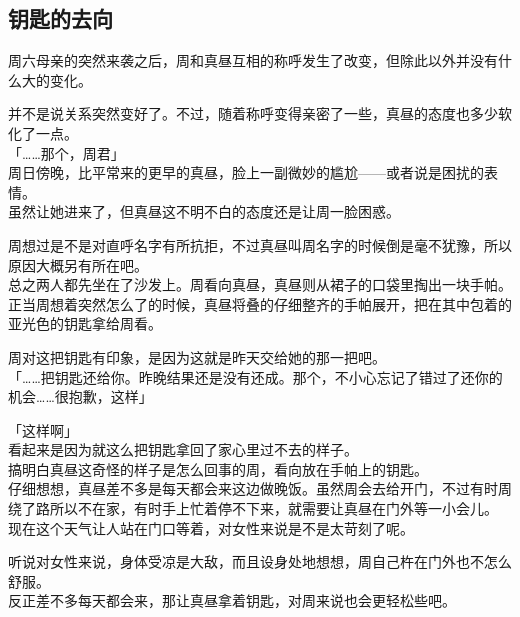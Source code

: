 \subsection{钥匙的去向}

周六母亲的突然来袭之后，周和真昼互相的称呼发生了改变，但除此以外并没有什么大的变化。

并不是说关系突然变好了。不过，随着称呼变得亲密了一些，真昼的态度也多少软化了一点。\\

「……那个，周君」\\

周日傍晚，比平常来的更早的真昼，脸上一副微妙的尴尬——或者说是困扰的表情。\\

虽然让她进来了，但真昼这不明不白的态度还是让周一脸困惑。

周想过是不是对直呼名字有所抗拒，不过真昼叫周名字的时候倒是毫不犹豫，所以原因大概另有所在吧。\\

总之两人都先坐在了沙发上。周看向真昼，真昼则从裙子的口袋里掏出一块手帕。\\

正当周想着突然怎么了的时候，真昼将叠的仔细整齐的手帕展开，把在其中包着的亚光色的钥匙拿给周看。

周对这把钥匙有印象，是因为这就是昨天交给她的那一把吧。\\

「……把钥匙还给你。昨晚结果还是没有还成。那个，不小心忘记了错过了还你的机会……很抱歉，这样」

「这样啊」\\

看起来是因为就这么把钥匙拿回了家心里过不去的样子。\\

搞明白真昼这奇怪的样子是怎么回事的周，看向放在手帕上的钥匙。\\

仔细想想，真昼差不多是每天都会来这边做晚饭。虽然周会去给开门，不过有时周绕了路所以不在家，有时手上忙着停不下来，就需要让真昼在门外等一小会儿。\\

现在这个天气让人站在门口等着，对女性来说是不是太苛刻了呢。

听说对女性来说，身体受凉是大敌，而且设身处地想想，周自己杵在门外也不怎么舒服。\\

反正差不多每天都会来，那让真昼拿着钥匙，对周来说也会更轻松些吧。\\

